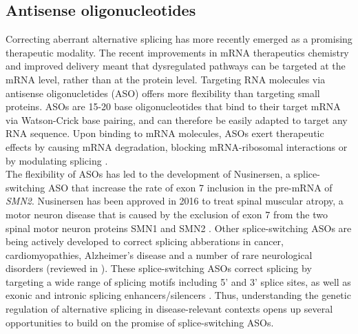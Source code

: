 \subsection{Antisense oligonucleotides}
Correcting aberrant alternative splicing has more recently emerged as a promising therapeutic modality. The recent improvements in mRNA therapeutics chemistry and improved delivery \cite{Clark2015-yx,Lorenzer2015-me,Suk2016-ik} meant that dysregulated pathways can be targeted at the mRNA level, rather than at the protein level. Targeting RNA molecules via antisense oligonucletides (ASO) offers more flexibility than targeting small proteins. ASOs are 15-20 base oligonucleotides that bind to their target mRNA via Watson-Crick base pairing, and can therefore be easily adapted to target any RNA sequence. Upon binding to mRNA molecules, ASOs exert therapeutic effects by causing mRNA degradation, blocking mRNA-ribosomal interactions or by modulating splicing \cite{Dhuri2020-pd}.\\

The flexibility of ASOs has led to the development of Nusinersen, a splice-switching ASO that increase the rate of exon 7 inclusion in the pre-mRNA of \textit{SMN2}. Nusinersen has been approved in 2016 to treat spinal muscular atropy, a motor neuron disease that is caused by the exclusion of exon 7 from the two spinal motor neuron proteins SMN1 and SMN2 \cite{Aartsma-Rus2017-zt}. Other splice-switching ASOs are being actively developed to correct splicing abberations in cancer, cardiomyopathies, Alzheimer's disease and a number of rare neurological disorders (reviewed in \cite{Havens2016-eq}). These splice-switching ASOs correct splicing by targeting a wide range of splicing motifs including 5' and 3' splice sites, as well as exonic and intronic splicing enhancers/silencers \cite{Havens2016-eq}. Thus, understanding the genetic regulation of alternative splicing in disease-relevant contexts opens up several opportunities to build on the promise of splice-switching ASOs. 






